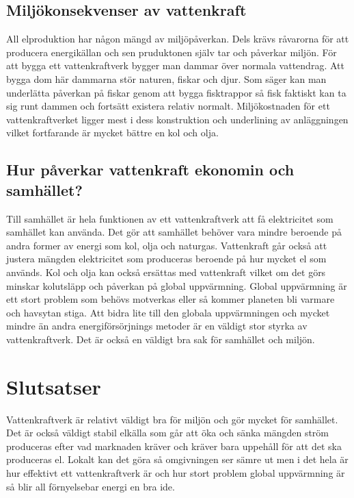 \documentclass[11p]{article}
\begin{document}
 \subsection{Miljökonsekvenser av vattenkraft}

 All elproduktion har någon mängd av miljöpåverkan. Dels krävs råvarorna för att producera energikällan och sen pruduktonen själv tar och påverkar miljön.
 För att bygga ett vattenkraftverk bygger man dammar över normala vattendrag.
 Att bygga dom här dammarna stör naturen, fiskar och djur.
 Som \textcite{vattenfall} säger kan man underlätta påverkan på fiskar genom att bygga fisktrappor så fisk faktiskt kan ta sig runt dammen och fortsätt existera relativ normalt.
 Miljökostnaden för ett vattenkraftverket ligger mest i dess konstruktion och underlining av anläggningen vilket fortfarande är mycket bättre en kol och olja.

 \subsection{Hur påverkar vattenkraft ekonomin och samhället?}
 Till samhället är hela funktionen av ett vattenkraftverk att få elektricitet som samhället kan använda.
 Det gör att samhället behöver vara mindre beroende på andra former av energi som kol, olja och naturgas.
 Vattenkraft går också att justera mängden elektricitet som produceras beroende på hur mycket el som används.
 Kol och olja kan också ersättas med vattenkraft vilket om det görs minskar kolutsläpp och påverkan på global uppvärmning.
 Global uppvärmning är ett stort problem som behövs motverkas eller så kommer planeten bli varmare och havsytan stiga. \parencite{naturvårdsverket}
 Att bidra lite till den globala uppvärmningen och mycket mindre än andra energiförsörjnings metoder är en väldigt stor styrka av vattenkraftverk.
 Det är också en väldigt bra sak för samhället och miljön.


 \section{Slutsatser}
 Vattenkraftverk är relativt väldigt bra för miljön och gör mycket för samhället.
 Det är också väldigt stabil elkälla som går att öka och sänka mängden ström produceras efter vad marknaden kräver och kräver bara uppehåll för att det ska produceras el.
 Lokalt kan det göra så omgivningen ser sämre ut men i det hela är hur effektivt ett vattenkraftverk är och hur stort problem global uppvärmning är så blir all förnyelsebar energi en bra ide.


 \printbibliography
\end{document}
